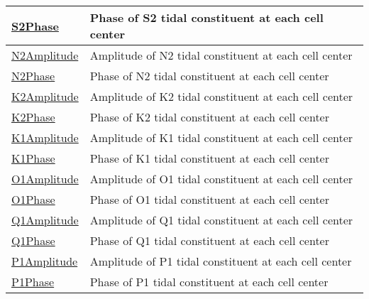 {\begin{center}
\begin{longtable}{| p{2.0in} | p{4.0in} |}
    \hline
    \hyperref[subsec:var_sec_harmonicAnalysisAM_S2Phase]{S2Phase} & Phase of S2 tidal constituent at each cell center \\
    \hline
    \hyperref[subsec:var_sec_harmonicAnalysisAM_N2Amplitude]{N2Amplitude} & Amplitude of N2 tidal constituent at each cell center \\
    \hline
    \hyperref[subsec:var_sec_harmonicAnalysisAM_N2Phase]{N2Phase} & Phase of N2 tidal constituent at each cell center \\
    \hline
    \hyperref[subsec:var_sec_harmonicAnalysisAM_K2Amplitude]{K2Amplitude} & Amplitude of K2 tidal constituent at each cell center \\
    \hline
    \hyperref[subsec:var_sec_harmonicAnalysisAM_K2Phase]{K2Phase} & Phase of K2 tidal constituent at each cell center \\
    \hline
    \hyperref[subsec:var_sec_harmonicAnalysisAM_K1Amplitude]{K1Amplitude} & Amplitude of K1 tidal constituent at each cell center \\
    \hline
    \hyperref[subsec:var_sec_harmonicAnalysisAM_K1Phase]{K1Phase} & Phase of K1 tidal constituent at each cell center \\
    \hline
    \hyperref[subsec:var_sec_harmonicAnalysisAM_O1Amplitude]{O1Amplitude} & Amplitude of O1 tidal constituent at each cell center \\
    \hline
    \hyperref[subsec:var_sec_harmonicAnalysisAM_O1Phase]{O1Phase} & Phase of O1 tidal constituent at each cell center \\
    \hline
    \hyperref[subsec:var_sec_harmonicAnalysisAM_Q1Amplitude]{Q1Amplitude} & Amplitude of Q1 tidal constituent at each cell center \\
    \hline
    \hyperref[subsec:var_sec_harmonicAnalysisAM_Q1Phase]{Q1Phase} & Phase of Q1 tidal constituent at each cell center \\
    \hline
    \hyperref[subsec:var_sec_harmonicAnalysisAM_P1Amplitude]{P1Amplitude} & Amplitude of P1 tidal constituent at each cell center \\
    \hline
    \hyperref[subsec:var_sec_harmonicAnalysisAM_P1Phase]{P1Phase} & Phase of P1 tidal constituent at each cell center \\
    \hline
\end{longtable}
\end{center}
}
